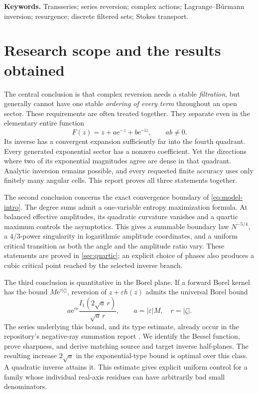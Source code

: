 \documentclass[11pt,a4paper]{article}
\numberwithin{equation}{section}
\theoremstyle{definition}
\theoremstyle{remark}
\newcommand{\ii}{\mathrm i}
\newcommand{\e}{\mathrm e}
\begin{document}
\vspace{5pt}
\noindent\textbf{Keywords.} Transseries; series reversion; complex actions;
Lagrange--B\"urmann inversion; resurgence; discrete filtered sets; Stokes transport.

\clearpage
{\footnotesize
\setlength{\parskip}{0pt}
\tableofcontents
}
\clearpage

\section{Research scope and the results obtained}\label{sec:scope}

The central conclusion is that complex reversion needs a stable \emph{filtration},
but generally cannot have one stable \emph{ordering of every term} throughout an
open sector. These requirements are often treated together. They separate even in
the elementary entire function
\begin{equation}\label{eq:model-intro}
 F(z)=z+a\e^{-z}+b\e^{-\ii z},\qquad ab\ne0.
\end{equation}
Its inverse has a convergent expansion sufficiently far into the fourth quadrant.
Every generated exponential sector has a nonzero coefficient. Yet the directions
where two of its exponential magnitudes agree are dense in that quadrant. Analytic
inversion remains possible, and every requested finite accuracy uses only finitely
many angular cells. This report proves all three statements together.

The second conclusion concerns the exact convergence boundary of
\eqref{eq:model-intro}. The degree sums admit a one-variable entropy
maximization formula. At balanced effective amplitudes, its quadratic
curvature vanishes and a quartic maximum controls the asymptotics.
This gives a summable boundary law $N^{-5/4}$, a $4/3$-power
singularity in logarithmic amplitude coordinates, and a uniform
critical transition as both the angle and the amplitude ratio vary.
These statements are proved in \cref{sec:quartic}; an explicit
choice of phases also produces a cubic critical point reached
by the selected inverse branch.

The third conclusion is quantitative in the Borel plane. If a forward Borel kernel has
the bound $M\e^{\tau|\zeta|}$, reversion of $z+\varepsilon h(z)$ admits the universal
Borel bound
\begin{equation}\label{eq:overview-bessel}
 a\e^{\tau r}\frac{I_1(2\sqrt a\,r)}{\sqrt a\,r},
 \qquad a=|\varepsilon|M,\quad r=|\zeta|.
\end{equation}
The series underlying this bound, and its type estimate, already occur
in the repository's negative-ray summation report \cite{repo-negative}.
We identify the Bessel function, prove sharpness, and derive matching
source and target inverse half-planes.
The resulting increase $2\sqrt a$ in the exponential-type bound is optimal over
this class. A quadratic inverse attains it. This estimate gives explicit uniform
control for a family whose individual real-axis residues can have arbitrarily bad
small denominators.
\end{document}
